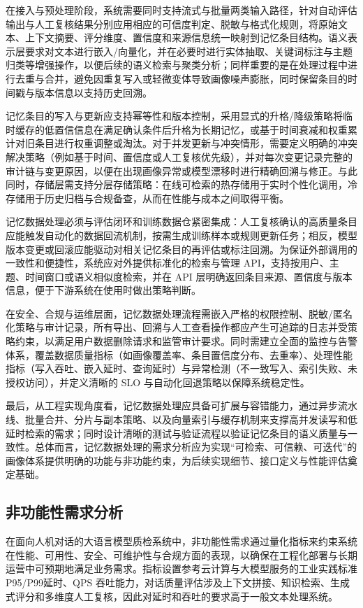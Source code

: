 在接入与预处理阶段，系统需要同时支持流式与批量两类输入路径，针对自动评估输出与人工复核结果分别应用相应的可信度判定、脱敏与格式化规则，将原始文本、上下文摘要、评分维度、置信度和来源信息统一映射到记忆条目结构。语义表示层要求对文本进行嵌入/向量化，并在必要时进行实体抽取、关键词标注与主题归类等增强操作，以便后续的语义检索与聚类分析；同样重要的是在处理过程中进行去重与合并，避免因重复写入或轻微变体导致画像噪声膨胀，同时保留条目的时间戳与版本信息以支持历史回溯。

记忆条目的写入与更新应支持幂等性和版本控制，采用显式的升格/降级策略将临时缓存的低置信信息在满足确认条件后升格为长期记忆，或基于时间衰减和权重累计对旧条目进行权重调整或淘汰。对于并发更新与冲突情形，需要定义明确的冲突解决策略（例如基于时间、置信度或人工复核优先级），并对每次变更记录完整的审计链与变更原因，以便在出现画像异常或模型漂移时进行精确回溯与修正。与此同时，存储层需支持分层存储策略：在线可检索的热存储用于实时个性化调用，冷存储用于历史归档与合规备查，从而在性能与成本之间取得平衡。

记忆数据处理必须与评估闭环和训练数据仓紧密集成：人工复核确认的高质量条目应能触发自动化的数据回流机制，按需生成训练样本或规则更新任务；相反，模型版本变更或回滚应能驱动对相关记忆条目的再评估或标注回溯。为保证外部调用的一致性和便捷性，系统应对外提供标准化的检索与管理 API，支持按用户、主题、时间窗口或语义相似度检索，并在 API 层明确返回条目来源、置信度与版本信息，便于下游系统在使用时做出策略判断。

在安全、合规与运维层面，记忆数据处理流程需嵌入严格的权限控制、脱敏/匿名化策略与审计记录，所有导出、回溯与人工查看操作都应产生可追踪的日志并受策略约束，以满足用户数据删除请求和监管审计要求。同时需建立全面的监控与告警体系，覆盖数据质量指标（如画像覆盖率、条目置信度分布、去重率）、处理性能指标（写入吞吐、嵌入延时、查询延时）与异常检测（不一致写入、索引失败、未授权访问），并定义清晰的 SLO 与自动化回退策略以保障系统稳定性。

最后，从工程实现角度看，记忆数据处理应具备可扩展与容错能力，通过异步流水线、批量合并、分片与副本策略、以及向量索引与缓存机制来支撑高并发读写和低延时检索的需求；同时设计清晰的测试与验证流程以验证记忆条目的语义质量与一致性。总体而言，记忆数据处理的需求分析应为实现“可检索、可信赖、可迭代”的画像体系提供明确的功能与非功能约束，为后续实现细节、接口定义与性能评估奠定基础。
\subsection{非功能性需求分析}
在面向人机对话的大语言模型质检系统中，非功能性需求通过量化指标来约束系统在性能、可用性、安全、可维护性与合规方面的表现，以确保在工程化部署与长期运营中可预期地满足业务需求。指标设置参考云计算与大模型服务的工业实践标准P95/P99延时、QPS 吞吐能力，对话质量评估涉及上下文拼接、知识检索、生成式评分和多维度人工复核，因此对延时和吞吐的要求高于一般文本处理系统。

